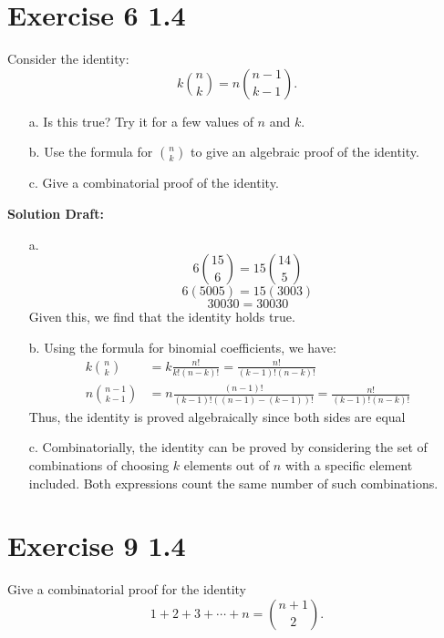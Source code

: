 \documentclass{article}
\begin{document}
\section*{Exercise 6 1.4}  

Consider the identity:
\[
k \binom{n}{k} = n \binom{n - 1}{k - 1}.
\]

\begin{enumerate}
    \item[a.] Is this true? Try it for a few values of \( n \) and \( k \).
    \item[b.] Use the formula for \( \binom{n}{k} \) to give an algebraic proof of the identity.
    \item[c.] Give a combinatorial proof of the identity.
\end{enumerate}

\vspace{0.5cm}
\noindent\textbf{Solution Draft:} 
\vspace{0.2cm}

\begin{enumerate}
    \item[a.] \[6 \binom{15}{6} = 15 \binom{14}{5}\]\[6(5005)=15(3003)\]\[30030=30030\] Given this, we find that the identity holds true.
    \item[b.] Using the formula for binomial coefficients, we have:
    \begin{align*}
    k \binom{n}{k} &= k \frac{n!}{k!(n - k)!} = \frac{n!}{(k - 1)!(n - k)!} \\
    n \binom{n - 1}{k - 1} &= n \frac{(n - 1)!}{(k - 1)!((n - 1) - (k - 1))!} = \frac{n!}{(k - 1)!(n - k)!}
    \end{align*}
    Thus, the identity is proved algebraically since both sides are equal
    \item[c.] Combinatorially, the identity can be proved by considering the set of combinations of choosing \( k \) elements out of \( n \) with a specific element included. Both expressions count the same number of such combinations.
\end{enumerate}

\section*{Exercise 9 1.4}  

Give a combinatorial proof for the identity 
\[
1 + 2 + 3 + \cdots + n = \binom{n+1}{2}.
\]
\end{document}
